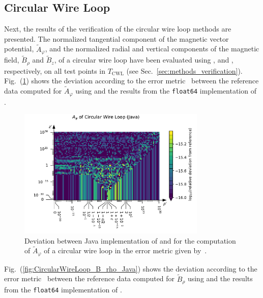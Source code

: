 \subsection{Circular Wire Loop}
Next, the results of the verification of the circular wire loop methods are presented.
The normalized tangential component of the magnetic vector potential, $\tilde{A}_\varphi$,
and the normalized radial and vertical components of the magnetic field, $\tilde{B}_\rho$ and $\tilde{B}_z$,
of a circular wire loop have been evaluated using , 
and , respectively,
on all test points in $T_\mathrm{CWL}$ (see Sec.~\ref{sec:methods_verification}).
Fig.~(\ref{fig:CircularWireLoop_A_phi_Java}) shows the deviation
according to the error metric~
between the reference data computed for $\tilde{A}_\varphi$ using 
and the results from the \texttt{float64} implementation of .
\begin{figure}[htbp]
 \centering
 \includegraphics[width=0.8\textwidth]{img/CircularWireLoop_A_phi_Java.pdf}
 \caption{Deviation between Java implementation of  and 
          for the computation of $\tilde{A}_\varphi$ of a circular wire loop
          in the error metric given by~.}
 \label{fig:CircularWireLoop_A_phi_Java}
\end{figure}
Fig.~(\ref{fig:CircularWireLoop_B_rho_Java}) shows the deviation
according to the error metric~
between the reference data computed for $\tilde{B}_\rho$ using 
and the results from the \texttt{float64} implementation of .
